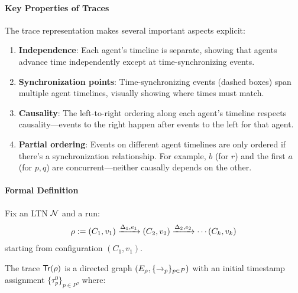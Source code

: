 \paragraph*{Key Properties of Traces}

The trace representation makes several important aspects explicit:

\begin{enumerate}
\item \textbf{Independence}: Each agent's timeline is separate, showing that agents advance time independently except at time-synchronizing events.

\item \textbf{Synchronization points}: Time-synchronizing events (dashed boxes) span multiple agent timelines, visually showing where times must match.

\item \textbf{Causality}: The left-to-right ordering along each agent's timeline respects causality---events to the right happen after events to the left for that agent.

\item \textbf{Partial ordering}: Events on different agent timelines are only ordered if there's a synchronization relationship. For example, $b$ (for $r$) and the first $a$ (for $p,q$) are concurrent---neither causally depends on the other.
\end{enumerate}

\paragraph*{Formal Definition}

Fix an LTN $\mathcal{N}$ and a run:
\[
\rho:= (C_1, v_1) \xrightarrow{\Delta_1, e_1} (C_2, v_2) \xrightarrow{\Delta_2, e_2} \cdots (C_k, v_k)
\]
starting from configuration $(C_1, v_1)$.

The trace $\textsf{Tr}(\rho)$ is a directed graph $(E_\rho, \{\xrightarrow{}_p\}_{p\in P})$ with an initial timestamp assignment $\{\tau^0_p\}_{p\in P}$, where:

